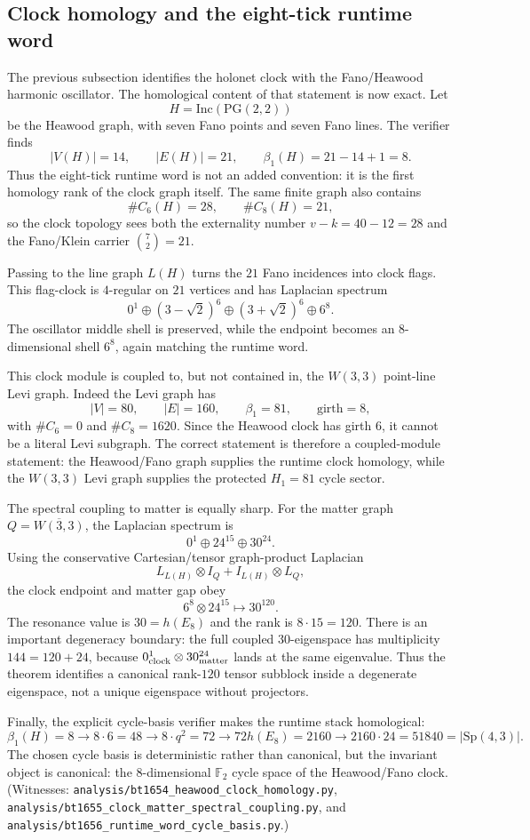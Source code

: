 \subsection{Clock homology and the eight-tick runtime word}
\label{sec:heawood-clock-homology}

The previous subsection identifies the holonet clock with the Fano/Heawood
harmonic oscillator.  The homological content of that statement is now exact.
Let
\[
  H=\mathrm{Inc}(\mathrm{PG}(2,2))
\]
be the Heawood graph, with seven Fano points and seven Fano lines.  The verifier
finds
\[
  |V(H)|=14,
  \qquad
  |E(H)|=21,
  \qquad
  \beta_1(H)=21-14+1=8.
\]
Thus the eight-tick runtime word is not an added convention: it is the first
homology rank of the clock graph itself.  The same finite graph also contains
\[
  \#C_6(H)=28,
  \qquad
  \#C_8(H)=21,
\]
so the clock topology sees both the externality number $v-k=40-12=28$ and the
Fano/Klein carrier $\binom72=21$.

Passing to the line graph $L(H)$ turns the $21$ Fano incidences into clock flags.
This flag-clock is $4$-regular on $21$ vertices and has Laplacian spectrum
\[
  0^1\oplus(3-\sqrt2)^6\oplus(3+\sqrt2)^6\oplus6^8.
\]
The oscillator middle shell is preserved, while the endpoint becomes an
$8$-dimensional shell $6^8$, again matching the runtime word.

This clock module is coupled to, but not contained in, the $W(3,3)$ point-line
Levi graph.  Indeed the Levi graph has
\[
  |V|=80,
  \qquad
  |E|=160,
  \qquad
  \beta_1=81,
  \qquad
  \mathrm{girth}=8,
\]
with $\#C_6=0$ and $\#C_8=1620$.  Since the Heawood clock has girth $6$, it cannot
be a literal Levi subgraph.  The correct statement is therefore a coupled-module
statement: the Heawood/Fano graph supplies the runtime clock homology, while the
$W(3,3)$ Levi graph supplies the protected $H_1=81$ cycle sector.

The spectral coupling to matter is equally sharp.  For the matter graph
$Q=\overline{W(3,3)}$, the Laplacian spectrum is
\[
  0^1\oplus24^{15}\oplus30^{24}.
\]
Using the conservative Cartesian/tensor graph-product Laplacian
\[
  L_{L(H)}\otimes I_Q+I_{L(H)}\otimes L_Q,
\]
the clock endpoint and matter gap obey
\[
  6^8\otimes24^{15}\longmapsto30^{120}.
\]
The resonance value is $30=h(E_8)$ and the rank is $8\cdot15=120$.  There is an
important degeneracy boundary: the full coupled $30$-eigenspace has multiplicity
$144=120+24$, because $0^1_{\rm clock}\otimes30^{24}_{\rm matter}$ lands at the
same eigenvalue.  Thus the theorem identifies a canonical rank-$120$ tensor
subblock inside a degenerate eigenspace, not a unique eigenspace without
projectors.

Finally, the explicit cycle-basis verifier makes the runtime stack homological:
\[
  \beta_1(H)=8
  \longrightarrow
  8\cdot6=48
  \longrightarrow
  8\cdot q^2=72
  \longrightarrow
  72h(E_8)=2160
  \longrightarrow
  2160\cdot24=51840=|\mathrm{Sp}(4,3)|.
\]
The chosen cycle basis is deterministic rather than canonical, but the invariant
object is canonical: the $8$-dimensional $\mathbb F_2$ cycle space of the
Heawood/Fano clock.  (Witnesses:
\texttt{analysis/bt1654\_heawood\_clock\_homology.py},
\texttt{analysis/bt1655\_clock\_matter\_spectral\_coupling.py}, and
\texttt{analysis/bt1656\_runtime\_word\_cycle\_basis.py}.)
